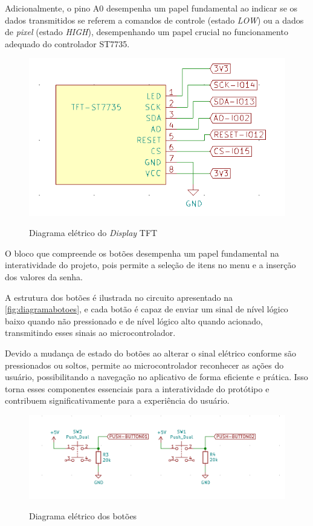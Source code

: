 Adicionalmente, o pino A0 desempenha um papel fundamental ao indicar 
se os dados transmitidos se referem a comandos de controle (estado \textit{LOW}) 
ou a dados de \textit{pixel} (estado \textit{HIGH}), desempenhando um papel crucial no 
funcionamento adequado do controlador ST7735.

\begin{figure}[h!]
    \centering
    \caption{Diagrama elétrico do \textit{Display} TFT}
    \includegraphics[scale=0.36]{figuras/modulo_tft.png}
    \fonte{}%
    \label{fig:diagramatft}
    \centering
\end{figure}

O bloco que compreende os botões desempenha um papel fundamental na 
interatividade do projeto, pois permite a seleção de itens no menu 
e a inserção dos valores da senha. 

A estrutura dos botões é 
ilustrada no circuito apresentado na \autoref{fig:diagramabotoes}, e 
cada botão é capaz de enviar um sinal de nível lógico baixo quando não 
pressionado e de nível lógico alto quando acionado, transmitindo esses 
sinais ao microcontrolador.

Devido a mudança de estado do botões ao alterar o sinal elétrico conforme 
são pressionados ou soltos, permite ao microcontrolador reconhecer as ações 
do usuário, possibilitando a navegação no aplicativo de forma eficiente 
e prática. Isso torna esses componentes essenciais para a interatividade 
do protótipo e contribuem significativamente para a experiência do usuário.

\begin{figure}[h!]
    \centering
    \caption{Diagrama elétrico dos botões}
    \includegraphics[scale=0.25]{figuras/modulo_push.png}
    \fonte{}%
    \label{fig:diagramabotoes}
    \centering
\end{figure}

